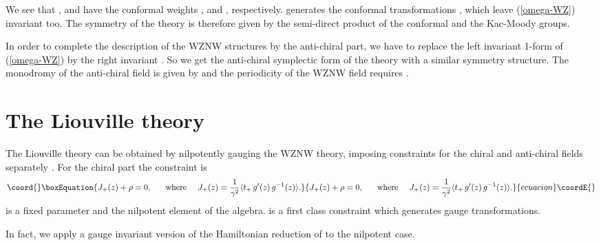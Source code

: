 \documentclass[a4paper,12pt]{article}
\providecommand{\rr}{\mathbb{R}}
\begin{document}
We see that \coordHE{}, \coordHE{} and
\coordHE{} have the conformal weights \coordHE{}, \coordHE{} and \coordHE{}, respectively.
\coordHE{} generates the conformal transformations
\coordHE{},
which leave (\ref{omega-WZ}) invariant too. The symmetry of the
\myHighlight{$SL(2,\rr)$}\coordHE{} theory is therefore given by the semi-direct product of the
conformal and the Kac-Moody groups.

\noindent
In order to complete the description of the \myHighlight{$SL(2,\rr)$}\coordHE{} WZNW
structures by the anti-chiral part, we have to replace the left
invariant 1-form \coordHE{} of (\ref{omega-WZ}) by the
right invariant \coordHE{}. So we
get the anti-chiral symplectic form of the theory with a similar
symmetry structure. The monodromy of the anti-chiral field
is given by \coordHE{} and the
periodicity of the WZNW field \coordHE{} requires \coordHE{}.

\setcounter{equation}{0}

\section {The Liouville theory}

The Liouville theory can be obtained by nilpotently gauging the
\myHighlight{$SL(2,\rr)$}\coordHE{} WZNW theory, imposing constraints for the chiral and
anti-chiral fields separately \cite{Balog}.   For the chiral part the
constraint is
\begin{equation}\coord{}\boxEquation{\label{constraint}
J_+(z)+\rho =0,~~~~~\mbox{where}~~~~
J_+(z)=\frac{1}{\gamma^2}\langle t_+\, g'(z)\, g^{-1}(z)\rangle.
}{J_+(z)+\rho =0,~~~~~\mbox{where}~~~~
J_+(z)=\frac{1}{\gamma^2}\langle t_+\, g'(z)\, g^{-1}(z)\rangle.
}{ecuacion}\coordE{}\end{equation}
\coordHE{} is a fixed parameter and \coordHE{} the nilpotent element
of the \myHighlight{$sl(2,\rr)$}\coordHE{} algebra. \coordHE{} is a first class constraint
which generates gauge transformations.

\noindent
In fact, we  apply a gauge invariant version
of the Hamiltonian reduction of \cite{FJW}
to the nilpotent case.
\end{document}
